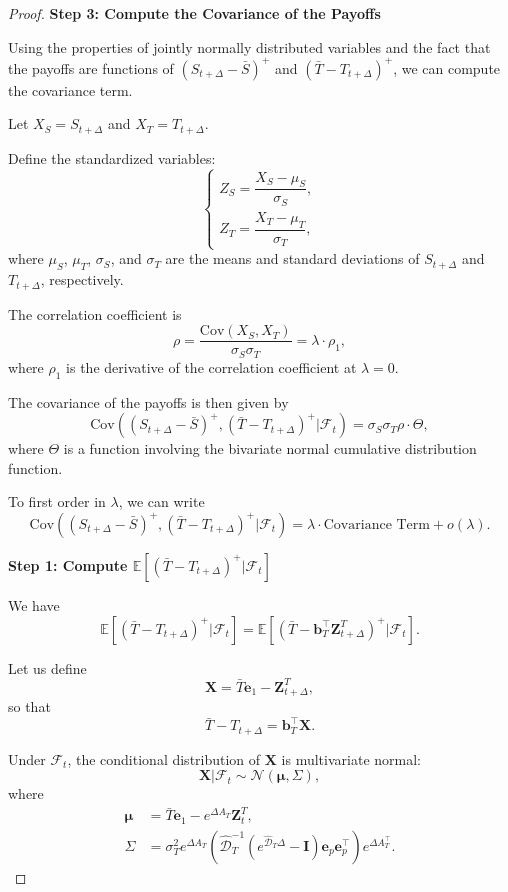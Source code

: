 \documentclass[10pt,a4paper,reqno]{amsart}
\theoremstyle{example}
\newcommand{\Cov}{\mathrm{Cov}}
\begin{document}
\begin{proof}
\textbf{Step 3: Compute the Covariance of the Payoffs}

Using the properties of jointly normally distributed variables and the fact that the payoffs are functions of $(S_{t+\Delta} - \bar{S})^+$ and $(\bar{T} - T_{t+\Delta})^+$, we can compute the covariance term.

Let $X_S = S_{t+\Delta}$ and $X_T = T_{t+\Delta}$.

Define the standardized variables:
\[
\begin{cases}
Z_S = \dfrac{X_S - \mu_S}{\sigma_S}, \\
Z_T = \dfrac{X_T - \mu_T}{\sigma_T},
\end{cases}
\]
where $\mu_S$, $\mu_T$, $\sigma_S$, and $\sigma_T$ are the means and standard deviations of $S_{t+\Delta}$ and $T_{t+\Delta}$, respectively.

The correlation coefficient is
\[
\rho = \dfrac{\Cov(X_S, X_T)}{\sigma_S \sigma_T} = \lambda \cdot \rho_1,
\]
where $\rho_1$ is the derivative of the correlation coefficient at $\lambda = 0$.

The covariance of the payoffs is then given by
\[
\Cov\left( (S_{t+\Delta} - \bar{S})^+, (\bar{T} - T_{t+\Delta})^+ \bigg| \mathcal{F}_t \right) = \sigma_S \sigma_T \rho \cdot \Theta,
\]
where $\Theta$ is a function involving the bivariate normal cumulative distribution function.

To first order in $\lambda$, we can write
\[
\Cov\left( (S_{t+\Delta} - \bar{S})^+, (\bar{T} - T_{t+\Delta})^+ \bigg| \mathcal{F}_t \right) = \lambda \cdot \text{Covariance Term} + o(\lambda).
\]


\textbf{Step 1: Compute $\mathbb{E}\left[ (\bar{T} - T_{t+\Delta})^+ \bigg| \mathcal{F}_t \right]$}

We have
\[
\mathbb{E}\left[ (\bar{T} - T_{t+\Delta})^+ \bigg| \mathcal{F}_t \right] = \mathbb{E}\left[ \left( \bar{T} - \mathbf{b}_T^\intercal \mathbf{Z}_{t+\Delta}^T \right)^+ \bigg| \mathcal{F}_t \right].
\]

Let us define
\[
\mathbf{X} = \bar{T} \mathbf{e}_1 - \mathbf{Z}_{t+\Delta}^T,
\]
so that
\[
\bar{T} - T_{t+\Delta} = \mathbf{b}_T^\intercal \mathbf{X}.
\]

Under $\mathcal{F}_t$, the conditional distribution of $\mathbf{X}$ is multivariate normal:
\[
\mathbf{X} \big| \mathcal{F}_t \sim \mathcal{N}(\boldsymbol{\mu}, \Sigma),
\]
where
\begin{align}
\boldsymbol{\mu} &= \bar{T} \mathbf{e}_1 - e^{\Delta A_T} \mathbf{Z}_t^T, \\
\Sigma &= \sigma_T^2 e^{\Delta A_T} \left( \hat{\mathcal{D}}_T^{-1} \left( e^{\hat{\mathcal{D}}_T \Delta} - \mathbf{I} \right) \mathbf{e}_p \mathbf{e}_p^\intercal \right) e^{\Delta A_T^\intercal}.
\end{align}


\end{proof}
\end{document}
